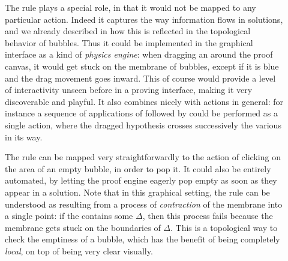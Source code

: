 \begin{scope}
\begin{description}
  \item[\textbf{\flow}]
    The {} rule plays a special role, in that it would not be mapped
    to any particular action. Indeed it captures the way information flows in
    solutions, and we already described in  how this is
    reflected in the topological behavior of bubbles. Thus it could be
    implemented in the graphical interface as a kind of \emph{physics engine}:
    when dragging an  around the proof canvas, it would get stuck on the
    membrane of bubbles, except if it is blue and the drag movement goes inward.
    This of course would provide a level of interactivity unseen before in a
    proving interface, making it very discoverable and playful. It also combines
    nicely with  actions in general: for instance a sequence of applications
    of {} followed by {} could be performed as
    a single  action, where the dragged hypothesis crosses successively the
    various  in its way.
  \item[\textbf{\membrane}]
    The {} rule can be mapped very straightforwardly to the action of
    clicking on the area of an empty bubble, in order to pop it. It could also
    be entirely automated, by letting the proof engine eagerly pop empty  as soon as they appear in a solution. Note that in this graphical setting,
    the {} rule can be understood as resulting from a process of
    \emph{contraction} of the membrane into a single point: if the  contains some
     $\Delta$, then this process fails because the membrane gets stuck on
    the boundaries of $\Delta$. This is a topological way to check the emptiness
    of a bubble, which has the benefit of being completely \emph{local}, on top
    of being very clear visually.
  \item[\textbf{\resource}]

\end{description}
\end{scope}
